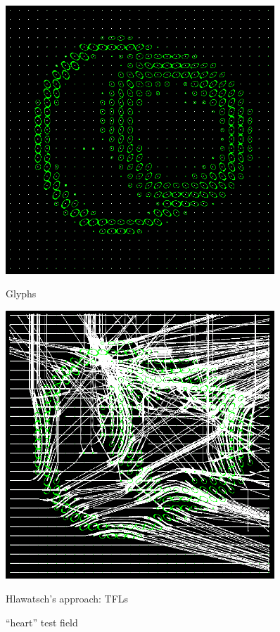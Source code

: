\documentclass{scrartcl}
\begin{document}
\begin{figure}[!t]
\centering
  \begin{minipage}{0.4\textwidth}
  \includegraphics[width=0.9\textwidth]{img/heartDwnsmpl.png}
    \caption*{Glyphs}
    \label{a)}
  \end{minipage}
  \begin{minipage}{0.4\textwidth}
    \includegraphics[width=0.9\textwidth]{img/heartDwnsmpl-TFL.PNG}
     \caption*{Hlawatsch's approach: TFLs}
    \label{b)}
  \end{minipage}
\caption{\enquote{heart} test field}
\label{heart-ftle-comp}
\end{figure}

%
%
%
\end{document}
